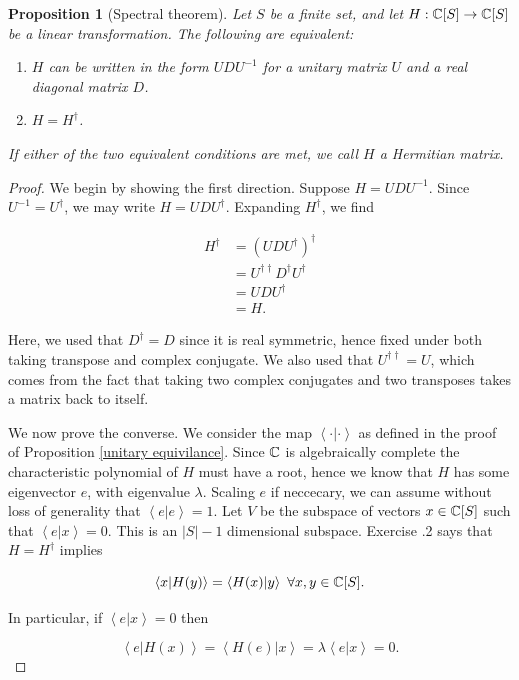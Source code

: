 \documentclass{article}
\newtheorem{proposition}{Proposition}[section]
\theoremstyle{definition}
\numberwithin{figure}{section}
\begin{document}
\begin{proposition}[Spectral theorem]\label{Spectral theorem} Let $S$ be a finite set, and let $H: \mathbb{C}[S]\to \mathbb{C}[S]$ be a linear transformation. The following are equivalent:

\begin{enumerate}
\item $H$ can be written in the form $UDU^{-1}$ for a unitary matrix $U$ and a real diagonal matrix $D$.
\item $H=H^{\dagger}$.
\end{enumerate}

If either of the two equivalent conditions are met, we call $H$ a Hermitian matrix.
\end{proposition}
\begin{proof} We begin by showing the first direction. Suppose $H=UDU^{-1}$. Since $U^{-1}=U^{\dagger}$, we may write $H=UDU^{\dagger}$. Expanding $H^{\dagger}$, we find

\begin{align*}
H^{\dagger}&=(UDU^{\dagger})^{\dagger}\\
&=U^{\dagger\dagger}D^{\dagger}U^{\dagger}\\
&=UDU^{\dagger}\\
&=H.
\end{align*}

Here, we used that $D^{\dagger}=D$ since it is real symmetric, hence fixed under both taking transpose and complex conjugate. We also used that $U^{\dagger\dagger}=U$, which comes from the fact that taking two complex conjugates and two transposes takes a matrix back to itself.

We now prove the converse. We consider the map $\left<\cdot |\cdot \right>$ as defined in the proof of Proposition \ref{unitary equivilance}. Since $\mathbb{C}$ is algebraically complete the characteristic polynomial of $H$ must have a root, hence we know that $H$ has some eigenvector $e$, with eigenvalue $\lambda$. Scaling $e$ if neccecary, we can assume without loss of generality that $\left<e | e\right> = 1$. Let $V$ be the subspace of vectors $x\in \mathbb{C}[S]$ such that $\left<e | x\right>=0$. This is an $|S|-1$ dimensional subspace. Exercise \thesection.2 says that $H=H^{\dagger}$ implies

$$\left<x | H(y)\right>=\left<H(x) |y\right>\,\, \forall x,y\in \mathbb{C}[S].$$

In particular, if $\left<e | x\right>=0$ then

$$\left< e | H(x) \right>=\left<H(e) | x \right>=\lambda \left< e| x \right>=0.$$


\end{proof}
\end{document}
